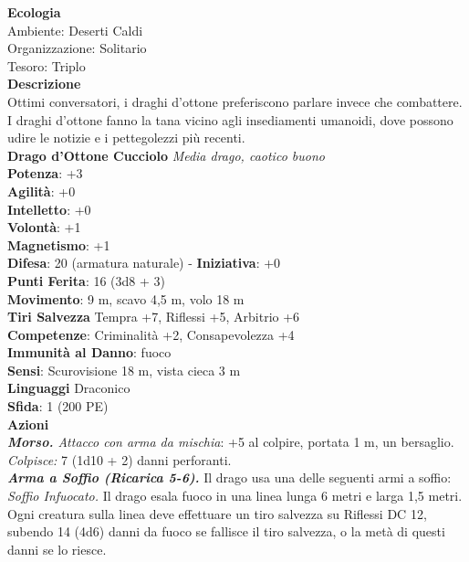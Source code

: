 \begin{multicols}{2}
\textbf{Ecologia}\\
Ambiente: Deserti Caldi\\
Organizzazione: Solitario\\
Tesoro: Triplo\\
\textbf{Descrizione}\\
Ottimi conversatori, i draghi d’ottone preferiscono parlare invece che combattere. I draghi d’ottone fanno la tana vicino agli insediamenti umanoidi, dove possono udire le notizie e i pettegolezzi più recenti.\\


\medskip\textbf{Drago d'Ottone Cucciolo}
\emph{Media drago, caotico buono}\\
\textbf{Potenza}: +3\\
\textbf{Agilità}: +0\\
\textbf{Intelletto}: +0\\
\textbf{Volontà}: +1\\
\textbf{Magnetismo}: +1\\
\textbf{Difesa}: 20 (armatura naturale) - \textbf{Iniziativa}: +0\\
\textbf{Punti Ferita}: 16 (3d8 + 3)\\
\textbf{Movimento}: 9 m, scavo 4,5 m, volo 18 m\\
\textbf{Tiri Salvezza} Tempra +7, Riflessi +5, Arbitrio +6\\
\textbf{Competenze}: Criminalità +2, Consapevolezza +4\\
\textbf{Immunità al Danno}: fuoco\\
\textbf{Sensi}: Scurovisione 18 m, vista cieca 3 m\\
\textbf{Linguaggi} Draconico\\
\textbf{Sfida}: 1 (200 PE)\smallskip\\
\smallskip\textbf{Azioni}\\
\emph{\textbf{Morso.} Attacco con arma da mischia}: +5 al colpire, portata 1 m, un bersaglio.\\
\emph{Colpisce:} 7 (1d10 + 2) danni perforanti.\\
\emph{\textbf{Arma a Soffio (Ricarica 5-6).}} Il drago usa una delle seguenti armi a soffio:\\
\emph{Soffio Infuocato.} Il drago esala fuoco in una linea lunga 6 metri e larga 1,5 metri. Ogni creatura sulla linea deve effettuare un tiro salvezza su Riflessi DC  12, subendo 14 (4d6) danni da fuoco se fallisce il tiro salvezza, o la metà di questi danni se lo riesce.\\

\end{multicols}

